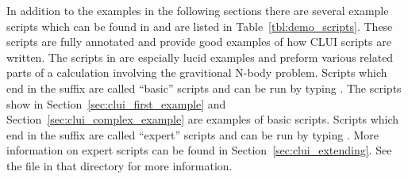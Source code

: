 \documentclass[12pt]{report}
\begin{document}
 In addition to the examples in the following sections there are
 several example scripts which can be found in
  and are listed in
 Table~\ref{tbl:demo_scripts}.  These scripts are fully annotated and
 provide good examples of how \AUTO CLUI scripts are written.  The
 scripts in  are espcially lucid
 examples and preform various related parts of a calculation involving
 the gravitional N-body problem.  
 Scripts which end in the
 suffix  are called ``basic'' scripts and can
 be run by typing .
 The scripts show in Section~\ref{sec:clui_first_example}
 and Section~\ref{sec:clui_complex_example} are examples
 of basic scripts.
 Scripts which end in the
 suffix  are called ``expert'' scripts and can
 be run by typing .
 More information on expert scripts can be 
 found in Section~\ref{sec:clui_extending}.
 See the  file in that
 directory for more information.
\end{document}

